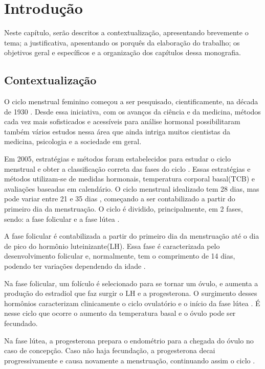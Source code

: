 \chapter*[Introdução]{Introdução}

Neste capítulo, serão descritos a contextualização, apresentando brevemente o tema; a justificativa, 
apesentando os porquês da elaboração do trabalho; os objetivos geral e específicos e a organização dos 
capítulos dessa monografia.

\section{Contextualização}

O ciclo menstrual feminino começou a ser pesquisado, cientificamente, na década de 1930 \cite{frank1931}.
Desde essa iniciativa, com os avanços da ciência e da medicina, métodos cada vez mais sofisticados e 
acessíveis para análise hormonal possibilitaram também vários estudos nessa área que ainda intriga 
muitos cientistas da medicina, psicologia e a sociedade em geral.


Em 2005, estratégias e métodos foram estabelecidos para estudar o ciclo menstrual e obter a 
classificação correta das fases do ciclo \cite{becker2005}.
Essas estratégias e métodos utilizam-se de medidas hormonais, temperatura corporal basal(TCB) e 
avaliações baseadas em calendário. O ciclo menstrual idealizado tem 28 dias, mas pode variar entre 21 
e 35 dias \cite{lenton1984a}, começando a ser contabilizado a partir do primeiro dia da menstruação. 
O ciclo é dividido, principalmente, em 2 fases, sendo: a fase folicular e a fase lútea 
\cite{brondin2008}.


A fase folicular é contabilizada a partir do primeiro dia da menstruação até o dia de pico do hormônio 
luteinizante(LH). Essa fase é caracterizada pelo desenvolvimento folicular e, normalmente, tem o 
comprimento de 14 
dias, podendo ter variações dependendo da idade \cite{lenton1984a}.

Na fase folicular, um folículo é selecionado para se tornar um óvulo, e aumenta a produção do estradiol
que faz surgir o LH e a progesterona. O surgimento desses hormônios caracterizam clinicamente o ciclo 
ovulatório e o início da fase lútea \cite{fritz2010}. É nesse ciclo que ocorre o aumento da temperatura
basal e o óvulo pode ser fecundado. 


Na fase lútea, a progesterona prepara o endométrio para a chegada do óvulo no caso de concepção. 
Caso não haja fecundação, a progesterona decai progressivamente e causa novamente a menstruação, 
continuando assim o ciclo \cite{nikas2003}.


